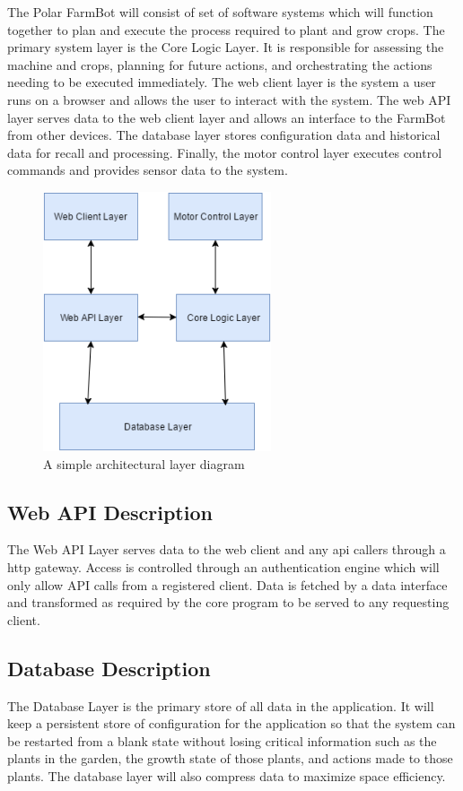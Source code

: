The Polar FarmBot will consist of set of software systems which will function together to plan and execute the process required to plant and grow crops. The primary system layer is the Core Logic Layer. It is responsible for assessing the machine and crops, planning for future actions, and orchestrating the actions needing to be executed immediately. The web client layer is the system a user runs on a browser and allows the user to interact with the system. The web API layer serves data to the web client layer and allows an interface to the FarmBot from other devices. The database layer stores configuration data and historical data for recall and processing. Finally, the motor control layer executes control commands and provides sensor data to the system. 

\begin{figure}[h!]
	\centering
 	\includegraphics[width=0.60\textwidth]{images/layers}
 \caption{A simple architectural layer diagram}
\end{figure}

\subsection{Web API Description}
The Web API Layer serves data to the web client and any api callers through a http gateway. Access is controlled through an authentication engine which will only allow API calls from a registered client. Data is fetched by a data interface and transformed as required by the core program to be served to any requesting client. 

\subsection{Database Description}
The Database Layer is the primary store of all data in the application. It will keep a persistent store of configuration for the application so that the system can be restarted from a blank state without losing critical information such as the plants in the garden, the growth state of those plants, and actions made to those plants. The database layer will also compress data to maximize space efficiency. 

